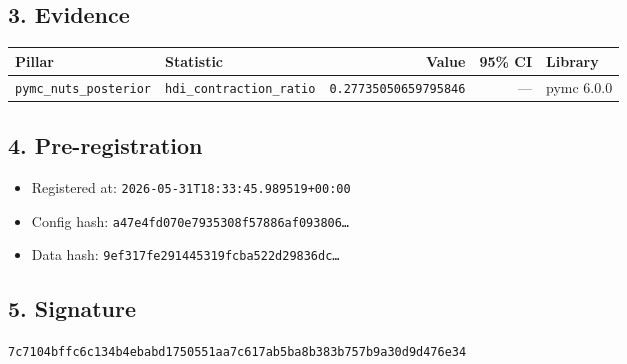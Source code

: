 \documentclass{article}
\begin{document}
\subsection*{3. Evidence}
\begin{tabular}{llrrl}\toprule
\textbf{Pillar} & \textbf{Statistic} & \textbf{Value} & \textbf{95\% CI} & \textbf{Library} \\\midrule
\texttt{pymc\_nuts\_posterior} & \texttt{hdi\_contraction\_ratio} & \texttt{0.27735050659795846} & --- & pymc 6.0.0 \\
\bottomrule\end{tabular}
\subsection*{4. Pre-registration}
\begin{itemize}
\item Registered at: \texttt{2026-05-31T18:33:45.989519+00:00}
\item Config hash: \texttt{a47e4fd070e7935308f57886af093806\dots}
\item Data hash: \texttt{9ef317fe291445319fcba522d29836dc\dots}
\end{itemize}
\subsection*{5. Signature}
\texttt{7c7104bffc6c134b4ebabd1750551aa7c617ab5ba8b383b757b9a30d9d476e34}\\
\end{document}
